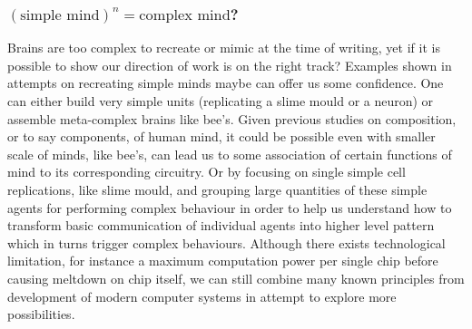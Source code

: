 \documentclass[11pt]{article}
\newenvironment{sketch}{\color{dark-green-2}}{\ignorespacesafterend}
\begin{document}
\begin{sketch}
\subsubsection*{$(\mbox{simple mind})^n = \mbox{complex mind}$?}
Brains are too complex to recreate or mimic at the time of writing, yet if it is possible to show our direction of  work is on the right track? Examples shown in attempts on recreating simple minds maybe can offer us some confidence. One can either build very simple units (replicating a slime mould or a neuron) or assemble meta-complex brains like bee's. Given previous studies on composition, or to say components, of human mind, it could be possible even with smaller scale of minds, like bee's, can lead us to some association of certain functions of mind to its corresponding circuitry. Or by focusing on single simple cell replications, like slime mould, and grouping large quantities of these simple agents for performing complex behaviour in order to help us understand how to transform basic communication of individual agents into higher level pattern which in turns trigger complex behaviours. Although there exists technological limitation, for instance a maximum computation power per single chip before causing meltdown on chip itself, we can still combine many known principles from development of modern computer systems in attempt to explore more possibilities. 
\end{sketch}
\end{document}
